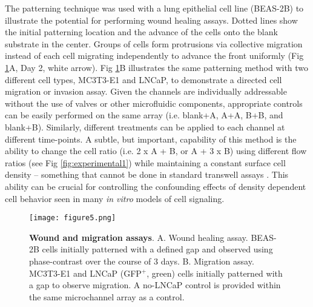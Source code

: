 
The patterning technique was used with a lung epithelial cell line (BEAS-2B) to illustrate the potential for performing wound healing assays. Dotted lines show the initial patterning location and the advance of the cells onto the blank substrate in the center. Groups of cells form protrusions via collective migration instead of each cell migrating independently to advance the front uniformly (Fig \ref{fig:cocultureData}A, Day 2, white arrow). Fig \ref{fig:cocultureData}B illustrates the same patterning method with two different cell types, MC3T3-E1 and LNCaP, to demonstrate a directed cell migration or invasion assay. Given the channels are individually addressable without the use of valves or other microfluidic components, appropriate controls can be easily performed on the same array (i.e. blank+A, A+A, B+B, and blank+B). Similarly, different treatments can be applied to each channel at different time-points. A subtle, but important, capability of this method is the ability to change the cell ratio (i.e. 2 x A + B, or A + 3 x B) using different flow ratios (see Fig \ref{fig:experimental1}) while maintaining a constant surface cell density -- something that cannot be done in standard transwell assays \cite{Domenech:2009jt}. This ability can be crucial for controlling the confounding effects of density dependent cell behavior seen in many \emph{in vitro} models of cell signaling.
\begin{figure}[!t]
\centering
\texttt{[image: figure5.png]}
\caption{\textbf{Wound and migration assays}. A. Wound healing assay. BEAS-2B cells initially patterned with a defined gap and observed using phase-contrast over the course of 3 days. B. Migration assay. MC3T3-E1 and LNCaP (GFP$^{+}$, green) cells initially patterned with a gap to observe migration. A no-LNCaP control is provided within the same microchannel array as a control.}
\label{fig:cocultureData}
\end{figure}

